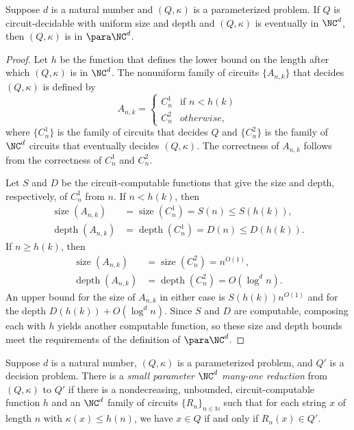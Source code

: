 \documentclass{article}
\DeclareMathOperator{\depth}{depth}
\DeclareMathOperator{\size}{size}
\begin{document}
\begin{theorem}\label{thm:eventually}
  Suppose $d$ is a natural number and $(Q, \kappa)$ is a parameterized problem.
  If $Q$ is circuit-decidable with uniform size and depth and $(Q, \kappa)$ is eventually in $\NC^d$, then $(Q, \kappa)$ is in $\para \NC^d$.
\end{theorem}
\begin{proof}
  Let $h$ be the function that defines the lower bound on the length after which $(Q, \kappa)$ is in $\NC^d$.
  The nonuniform family of circuits $\{A_{n, k}\}$ that decides $(Q, \kappa)$ is defined by
  \[
  A_{n, k} =
  \begin{cases}
    C^1_n & \text{if } n < h(k) \\
    C^2_n & otherwise,
  \end{cases}
  \]
  where $\{C^1_n\}$ is the family of circuits that decides $Q$ and $\{C^2_n\}$ is the family of $\NC^d$ circuits that eventually decides $(Q, \kappa)$.
  The correctness of $A_{n, k}$ follows from the correctness of $C^1_n$ and $C^2_n$.

  Let $S$ and $D$ be the circuit-computable functions that give the size and depth, respectively, of $C^1_n$ from $n$.
  If $n < h(k)$, then
  \begin{align*}
    \size(A_{n, k}) & = \size(C^1_n) = S(n) \leq S(h(k)), \\
    \depth(A_{n, k}) & = \depth(C^1_n) = D(n) \leq D(h(k)).
  \end{align*}
  If $n \geq h(k)$, then
  \begin{align*}
    \size(A_{n, k}) & = \size(C^2_n) = n^{O(1)}, \\
    \depth(A_{n, k}) & = \depth(C^2_n) = O(\log^d n).
  \end{align*}
  An upper bound for the size of $A_{n, k}$ in either case is $S(h(k)) n^{O(1)}$ and for the depth $D(h(k)) + O(\log^d n)$.
  Since $S$ and $D$ are computable, composing each with $h$ yields another computable function, so these size and depth bounds meet the requirements of the definition of $\para \NC^d$.
\end{proof}

\begin{definition}\label{def:spreduction}
  Suppose $d$ is a natural number, $(Q, \kappa)$ is a parameterized problem, and $Q'$ is a decision problem.
  There is a \emph{small parameter $\NC^d$ many-one reduction} from $(Q, \kappa)$ to $Q'$ if there is a nondecreasing, unbounded, circuit-computable function $h$ and an $\NC^d$ family of circuits $\{R_n\}_{n \in \mathbb{N}}$ such that for each string $x$ of length $n$ with $\kappa(x) \leq h(n)$, we have $x \in Q$ if and only if $R_n(x) \in Q'$.
\end{definition}
\end{document}
